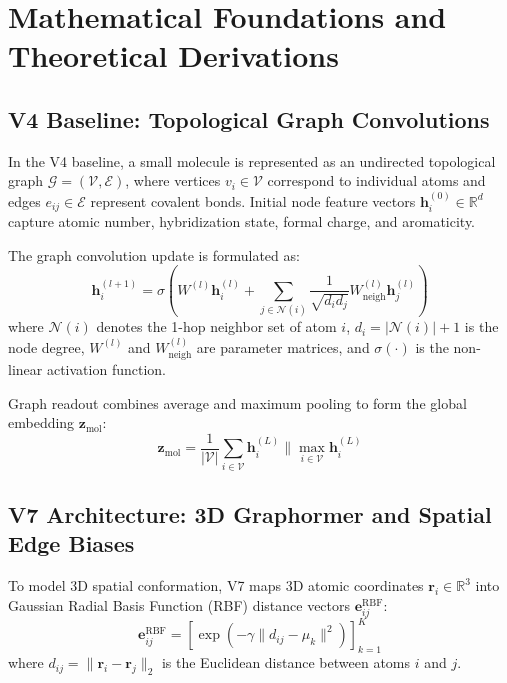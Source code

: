 \documentclass[10pt,journal,compsoc]{IEEEtran}
\begin{document}
\section{Mathematical Foundations and Theoretical Derivations}

\subsection{V4 Baseline: Topological Graph Convolutions}
In the V4 baseline, a small molecule is represented as an undirected topological graph $\mathcal{G} = (\mathcal{V}, \mathcal{E})$, where vertices $v_i \in \mathcal{V}$ correspond to individual atoms and edges $e_{ij} \in \mathcal{E}$ represent covalent bonds. Initial node feature vectors $\mathbf{h}_i^{(0)} \in \mathbb{R}^d$ capture atomic number, hybridization state, formal charge, and aromaticity.

The graph convolution update is formulated as:
\begin{equation}
\mathbf{h}_i^{(l+1)} = \sigma \left( W^{(l)} \mathbf{h}_i^{(l)} + \sum_{j \in \mathcal{N}(i)} \frac{1}{\sqrt{d_i d_j}} W_{\text{neigh}}^{(l)} \mathbf{h}_j^{(l)} \right)
\end{equation}
where $\mathcal{N}(i)$ denotes the 1-hop neighbor set of atom $i$, $d_i = |\mathcal{N}(i)| + 1$ is the node degree, $W^{(l)}$ and $W_{\text{neigh}}^{(l)}$ are parameter matrices, and $\sigma(\cdot)$ is the non-linear activation function.

Graph readout combines average and maximum pooling to form the global embedding $\mathbf{z}_{\text{mol}}$:
\begin{equation}
\mathbf{z}_{\text{mol}} = \frac{1}{|\mathcal{V}|} \sum_{i \in \mathcal{V}} \mathbf{h}_i^{(L)} \parallel \max_{i \in \mathcal{V}} \mathbf{h}_i^{(L)}
\end{equation}

\subsection{V7 Architecture: 3D Graphormer and Spatial Edge Biases}
To model 3D spatial conformation, V7 maps 3D atomic coordinates $\mathbf{r}_i \in \mathbb{R}^3$ into Gaussian Radial Basis Function (RBF) distance vectors $\mathbf{e}_{ij}^{\text{RBF}}$:
\begin{equation}
\mathbf{e}_{ij}^{\text{RBF}} = \left[ \exp\left( -\gamma \| d_{ij} - \mu_k \|^2 \right) \right]_{k=1}^K
\end{equation}
where $d_{ij} = \| \mathbf{r}_i - \mathbf{r}_j \|_2$ is the Euclidean distance between atoms $i$ and $j$.
\end{document}
